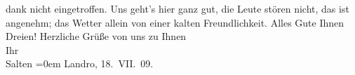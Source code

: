 \begin{ledgroupsized}[t]{13cm}
               dank nicht eingetroffen. Uns geht’s hier ganz gut, die Leute stören nicht, das \label{K_L03503-1v}\label{K_L03503-1h} ist angenehm; das Wetter allein von einer kalten Freundlichkeit.
               Alles Gute Ihnen Dreien! \pend
           \pstart
           Herzliche Grüße von uns zu Ihnen {\\[\baselineskip]}Ihr {\\[\baselineskip]}\spacefill\mbox{Salten}\pend
           \leftskip=0em{}\pstart
           Landro, 18. VII. 09.\pend
           
         
         \endnumbering{}\end{ledgroupsized}  \newcommand{\dateiname}{L03503}\newcommand{\titel}{Felix Salten an Arthur Schnitzler, 18. 7. 1909}\newcommand{\editorInnen}{Martin Anton Müller und Laura Untner}
      